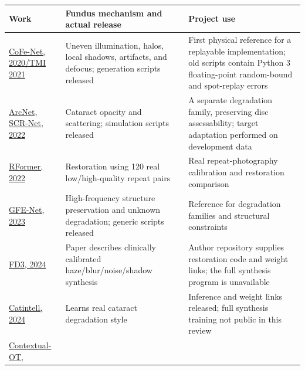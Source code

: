 \documentclass[
  10pt,
]{article}
\begin{document}
\begin{longtable}[]{@{}
  >{\raggedright\arraybackslash}p{}
  >{\raggedright\arraybackslash}p{}
  >{\raggedright\arraybackslash}p{}@{}}
\toprule\noalign{}
\begin{minipage}[b]{\linewidth}\raggedright
Work
\end{minipage} & \begin{minipage}[b]{\linewidth}\raggedright
Fundus mechanism and actual release
\end{minipage} & \begin{minipage}[b]{\linewidth}\raggedright
Project use
\end{minipage} \\
\midrule\noalign{}
\endhead
\bottomrule\noalign{}
\endlastfoot
\href{https://arxiv.org/abs/2005.05594}{CoFe-Net, 2020/TMI 2021} &
Uneven illumination, halos, local shadows, artifacts, and defocus;
generation scripts released & First physical reference for a replayable
implementation; old scripts contain Python 3 floating-point random-bound
and spot-replay errors \\
\href{https://arxiv.org/abs/2203.07737}{ArcNet},
\href{https://arxiv.org/abs/2206.04684}{SCR-Net, 2022} & Cataract
opacity and scattering; simulation scripts released & A separate
degradation family, preserving disc assessability; target adaptation
performed on development data \\
\href{https://arxiv.org/abs/2201.00466}{RFormer, 2022} & Restoration
using 120 real low/high-quality repeat pairs & Real repeat-photography
calibration and restoration comparison \\
\href{https://arxiv.org/abs/2309.00885}{GFE-Net, 2023} & High-frequency
structure preservation and unknown degradation; generic scripts released
& Reference for degradation families and structural constraints \\
\href{https://arxiv.org/abs/2409.12377}{FD3, 2024} & Paper describes
clinically calibrated haze/blur/noise/shadow synthesis & Author
repository supplies restoration code and weight links; the full
synthesis program is unavailable \\
\href{https://arxiv.org/abs/2411.12278}{Catintell, 2024} & Learns real
cataract degradation style & Inference and weight links released; full
synthesis training not public in this review \\
\href{https://arxiv.org/abs/2409.07862}{Contextual-OT},

\end{longtable}
\end{document}
